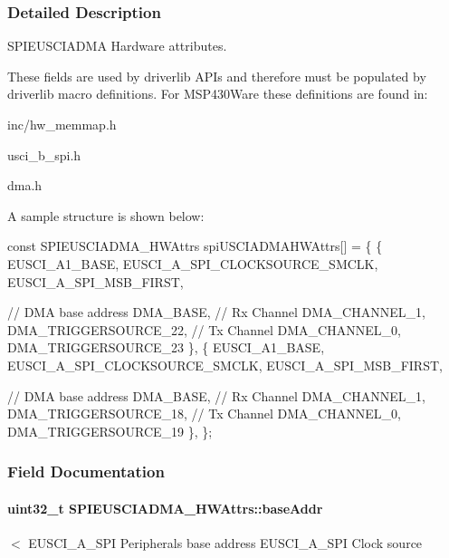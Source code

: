 \subsubsection{Detailed Description}
S\+P\+I\+E\+U\+S\+C\+I\+A\+D\+M\+A Hardware attributes. 

These fields are used by driverlib A\+P\+Is and therefore must be populated by driverlib macro definitions. For M\+S\+P430\+Ware these definitions are found in\+:
\begin{DoxyItemize}
\item inc/hw\+\_\+memmap.\+h
\item usci\+\_\+b\+\_\+spi.\+h
\item dma.\+h
\end{DoxyItemize}

A sample structure is shown below\+: 
\begin{DoxyCode}
\textcolor{keyword}{const} SPIEUSCIADMA_HWAttrs spiUSCIADMAHWAttrs[] = \{
    \{
        EUSCI\_A1\_BASE,
        EUSCI\_A\_SPI\_CLOCKSOURCE\_SMCLK,
        EUSCI\_A\_SPI\_MSB\_FIRST,

        \textcolor{comment}{// DMA base address}
        DMA\_BASE,
        \textcolor{comment}{// Rx Channel}
        DMA\_CHANNEL\_1,
        DMA\_TRIGGERSOURCE\_22,
        \textcolor{comment}{// Tx Channel}
        DMA\_CHANNEL\_0,
        DMA\_TRIGGERSOURCE\_23
    \},
    \{
        EUSCI\_A1\_BASE,
        EUSCI\_A\_SPI\_CLOCKSOURCE\_SMCLK,
        EUSCI\_A\_SPI\_MSB\_FIRST,

        \textcolor{comment}{// DMA base address}
        DMA\_BASE,
        \textcolor{comment}{// Rx Channel}
        DMA\_CHANNEL\_1,
        DMA\_TRIGGERSOURCE\_18,
        \textcolor{comment}{// Tx Channel}
        DMA\_CHANNEL\_0,
        DMA\_TRIGGERSOURCE\_19
    \},
\};
\end{DoxyCode}
 

\subsubsection{Field Documentation}
\paragraph[{base\+Addr}]{\setlength{\rightskip}{0pt plus 5cm}uint32\+\_\+t S\+P\+I\+E\+U\+S\+C\+I\+A\+D\+M\+A\+\_\+\+H\+W\+Attrs\+::base\+Addr}\label{struct_s_p_i_e_u_s_c_i_a_d_m_a___h_w_attrs_a2d0c61d4d3b6d0bc7be6c8099777218b}
$<$ E\+U\+S\+C\+I\+\_\+\+A\+\_\+\+S\+P\+I Peripheral\textquotesingle{}s base address E\+U\+S\+C\+I\+\_\+\+A\+\_\+\+S\+P\+I Clock source 
